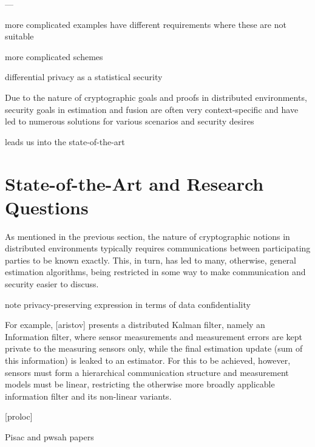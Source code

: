 ---



more complicated examples have different requirements where these are not suitable

more complicated schemes

differential privacy as a statistical security

Due to the nature of cryptographic goals and proofs in distributed environments, security goals in estimation and fusion are often very context-specific and have led to numerous solutions for various scenarios and security desires

leads us into the state-of-the-art

% 
%                                             
%                                             
%                                             
% 
\section{State-of-the-Art and Research Questions}

As mentioned in the previous section, the nature of cryptographic notions in distributed environments typically requires communications between participating parties to be known exactly. This, in turn, has led to many, otherwise, general estimation algorithms, being restricted in some way to make communication and security easier to discuss.

note privacy-preserving expression in terms of data confidentiality

For example, [aristov] presents a distributed Kalman filter, namely an Information filter, where sensor measurements and measurement errors are kept private to the measuring sensors only, while the final estimation update (sum of this information) is leaked to an estimator. For this to be achieved, however, sensors must form a hierarchical communication structure and measurement models must be linear, restricting the otherwise more broadly applicable information filter and its non-linear variants.

[proloc]

Pisac and pwsah papers

